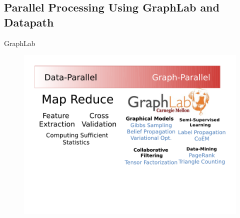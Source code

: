 \documentclass[onlymath,xcolor=pdftex,dvipsnames,table]{beamer}
\begin{document}






\subsection{Parallel Processing Using GraphLab and Datapath}
\begin{frame}{GraphLab}
\begin{figure}
  \centering
  \includegraphics[clip,trim=20pt 150pt 20pt 30pt,width=.9\textwidth]{graphlab.pdf}
\end{figure}
\end{frame}
\end{document}
